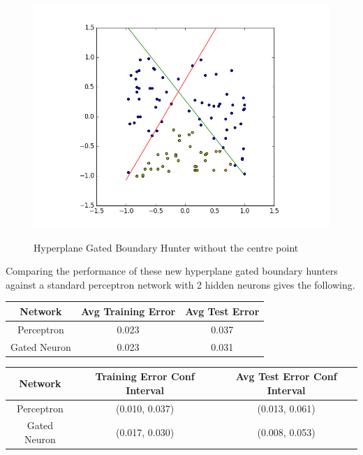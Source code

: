 \documentclass[notitlepage]{report}
\theoremstyle{definition}
\begin{document}
\begin{figure}[H]
  \centering
  \begin{minipage}[b]{0.8\textwidth}
    \includegraphics[width=\textwidth]{GN-MH-ONLY-01.png}
    \caption{}
    \label{fig:GN_MH-ONLY-01}
  \end{minipage}
  \hfill

Hyperplane Gated Boundary Hunter without the centre point
\end{figure}

Comparing the performance of these new hyperplane gated boundary hunters against a standard perceptron network with 2 hidden neurons gives the following.

\begin{center}
\begin{tabular}{| c | c | c |}
\hline
Network & Avg Training Error & Avg Test Error \\
\hline
\hline
Perceptron & 0.023 & 0.037 \\
\hline
Gated Neuron & 0.023 & 0.031 \\
\hline
\end{tabular}
\end{center}

\begin{center}
\begin{tabular}{| c | c | c |}
\hline
Network & Training Error Conf Interval & Avg Test Error Conf Interval\\
\hline
\hline
Perceptron & (0.010, 0.037) & (0.013, 0.061)\\
\hline
Gated Neuron & (0.017, 0.030) & (0.008, 0.053)\\
\hline
\end{tabular}
\end{center}
\end{document}
